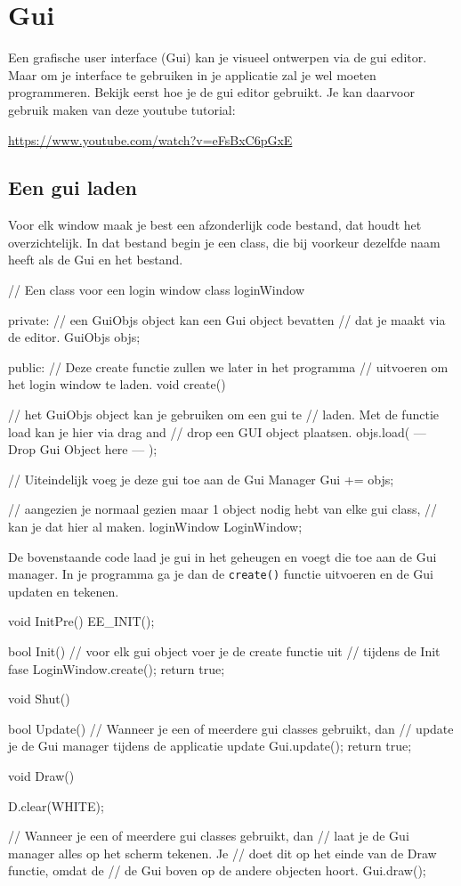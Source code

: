 \chapter{Gui}

Een grafische user interface (Gui) kan je visueel ontwerpen via de gui editor. Maar om je interface te gebruiken in je applicatie zal je wel moeten programmeren.
Bekijk eerst hoe je de gui editor gebruikt. Je kan daarvoor gebruik maken van deze youtube tutorial:

\url{https://www.youtube.com/watch?v=eFsBxC6pGxE}

\section{Een gui laden}

Voor elk window maak je best een afzonderlijk code bestand, dat houdt het overzichtelijk. In dat bestand begin je een class, die bij voorkeur dezelfde naam heeft als de Gui en het bestand. 

\begin{code}
// Een class voor een login window
class loginWindow
{
private:
	 // een GuiObjs object kan een Gui object bevatten
	 // dat je maakt via de editor.
   GuiObjs objs;
   
public:
   // Deze create functie zullen we later in het programma
	 // uitvoeren om het login window te laden.
   void create()
   {
	    // het GuiObjs object kan je gebruiken om een gui te
			// laden. Met de functie load kan je hier via drag and 
			// drop een GUI object plaatsen.
      objs.load( --- Drop Gui Object here --- );
      
			// Uiteindelijk voeg je deze gui toe aan de Gui Manager
      Gui += objs;
   }
   
}

// aangezien je normaal gezien maar 1 object nodig hebt van elke gui class,
// kan je dat hier al maken.
loginWindow LoginWindow;
\end{code}

De bovenstaande code laad je gui in het geheugen en voegt die toe aan de Gui manager. In je programma ga je dan de \texttt{create()} functie uitvoeren en de Gui updaten en tekenen.

\begin{code}
void InitPre()
{
   EE_INIT();
}

bool Init()
{
   // voor elk gui object voer je de create functie uit
   // tijdens de Init fase
   LoginWindow.create();
   return true;
}

void Shut() {}

bool Update()
{
   // Wanneer je een of meerdere gui classes gebruikt, dan 
   // update je de Gui manager tijdens de applicatie update
   Gui.update();
   return true;
}

void Draw()
{
   D.clear(WHITE);
   
   // Wanneer je een of meerdere gui classes gebruikt,  dan
   // laat je de Gui manager alles op het scherm tekenen. Je
   // doet dit op het einde van de Draw functie,  omdat de 
   // de Gui boven op de andere objecten hoort.
   Gui.draw();
}
\end{code} 

